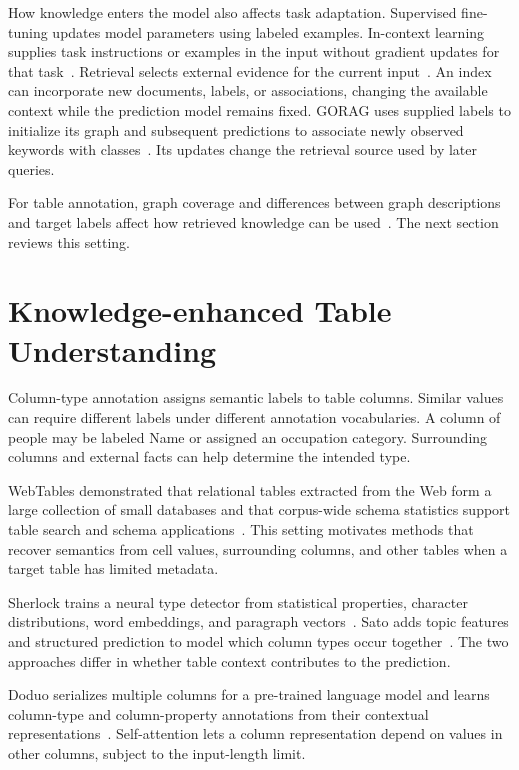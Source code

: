 How knowledge enters the model also affects task adaptation. Supervised fine-tuning updates model parameters using labeled examples. In-context learning supplies task instructions or examples in the input without gradient updates for that task~\cite{lit-brown2020language}. Retrieval selects external evidence for the current input~\cite{bg-rag}. An index can incorporate new documents, labels, or associations, changing the available context while the prediction model remains fixed. GORAG uses supplied labels to initialize its graph and subsequent predictions to associate newly observed keywords with classes~\cite{bg-gorag}. Its updates change the retrieval source used by later queries.

For table annotation, graph coverage and differences between graph descriptions and target labels affect how retrieved knowledge can be used~\cite{bg-kglink}. The next section reviews this setting.

\section{Knowledge-enhanced Table Understanding}
\label{sec:background:tables}

Column-type annotation assigns semantic labels to table columns. Similar values can require different labels under different annotation vocabularies. A column of people may be labeled Name or assigned an occupation category. Surrounding columns and external facts can help determine the intended type.

WebTables demonstrated that relational tables extracted from the Web form a large collection of small databases and that corpus-wide schema statistics support table search and schema applications~\cite{lit-cafarella2008webtables}. This setting motivates methods that recover semantics from cell values, surrounding columns, and other tables when a target table has limited metadata.

Sherlock trains a neural type detector from statistical properties, character distributions, word embeddings, and paragraph vectors~\cite{bg-sherlock}. Sato adds topic features and structured prediction to model which column types occur together~\cite{bg-sato}. The two approaches differ in whether table context contributes to the prediction.

Doduo serializes multiple columns for a pre-trained language model and learns column-type and column-property annotations from their contextual representations~\cite{bg-doduo}. Self-attention lets a column representation depend on values in other columns, subject to the input-length limit.

